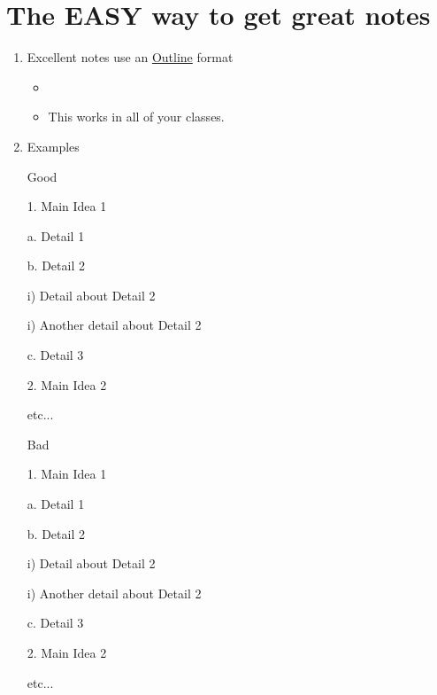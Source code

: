 \documentclass[../../Main/main.tex]{subfiles}
\begin{document}
\section{The EASY way to get great notes}

\begin{enumerate}
	\item Excellent notes use an \underline{Outline} format
	      \begin{itemize}
		      \item {}
		      \item This works in all of your classes.
	      \end{itemize}
	\item Examples
	      \begin{boxGreen}{Good}

		      1. Main Idea 1

		      \quad a. Detail 1

		      \quad b. Detail 2


		      \quad \quad i) Detail about Detail 2

		      \quad \quad i) Another detail about Detail 2

		      \quad c. Detail 3

		      2. Main Idea 2

		      \quad \quad etc...
	      \end{boxGreen}

	      \begin{boxRed}{Bad}

		      1. Main Idea 1

		      a. Detail 1

		      b. Detail 2

		      i) Detail about Detail 2

		      i) Another detail about Detail 2

		      c. Detail 3

		      2. Main Idea 2

		      \quad \quad etc...

	      \end{boxRed}


\end{enumerate}
\end{document}

